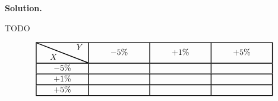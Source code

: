\documentclass[12pt]{article}
\newenvironment{solution}{\vspace{0.2cm} \textbf{Solution.}}{}
\begin{document}
\begin{enumerate}[label=(\alph*)]
		\begin{solution}
			
			TODO
			
		\[
		\linethickness{1pt}
		\setlength{\arrayrulewidth}{1pt}
		\begin{tabular}{|c|c|c|c|}
			\hline
			\backslashbox{$\quad X$}{$\quad Y$} & $\qquad -5\% \qquad$ & \qquad $+1\%\qquad$ & \qquad $+5\%\qquad$ \\ \hline
			$-5\%$ &  &  & \\ \hline
			$+1\%$ &  &  & \\ \hline
			$+5\%$ &  &  & \\ \hline
		\end{tabular}
		\]
			
		\end{solution}
	
	\end{enumerate}
\end{document}
